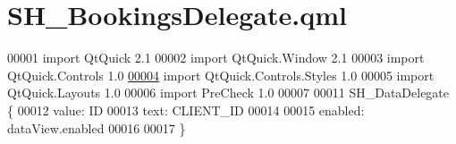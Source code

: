 \hypertarget{SH__BookingsDelegate_8qml}{\section{S\-H\-\_\-\-Bookings\-Delegate.\-qml}
\label{SH__BookingsDelegate_8qml}
}

\begin{DoxyCode}
00001 \textcolor{keyword}{import} QtQuick 2.1
00002 import QtQuick.Window 2.1
00003 import QtQuick.Controls 1.0
\hypertarget{SH__BookingsDelegate_8qml_source_l00004}{}\hyperlink{classSH__BookingsDelegate}{00004} import QtQuick.Controls.Styles 1.0
00005 import QtQuick.Layouts 1.0
00006 import PreCheck 1.0
00007 
00011 SH\_DataDelegate \{
00012     value: ID
00013     text: CLIENT\_ID
00014 
00015     enabled: dataView.enabled
00016 
00017 \}
\end{DoxyCode}
